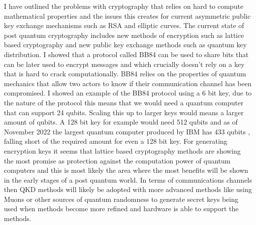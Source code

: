 \documentclass{article}
\begin{document}
I have outlined the problems with cryptography that relies on hard to compute mathematical properties and the issues this creates for current asymmetric public key exchange mechanisms such as RSA and elliptic curves. The current state of post quantum cryptography includes new methods of encryption such as lattice based cryptography and new public key exchange methods such as quantum key distribution. I showed that a protocol called BB84 can be used to share bits that can be later used to encrypt messages and which crucially doesn't rely on a key that is hard to crack computationally. BB84 relies on the properties of quantum mechanics that allow two actors to know if their communication channel has been compromised. I showed an example of the BB84 protocol using a 6 bit key, due to the nature of the protocol this means that we would need a quantum computer that can support 24 qubits. Scaling this up to larger keys would means a larger amount of qubits. A 128 bit key for example would need 512 qubits and as of November 2022 the largest quantum computer produced by IBM has 433 qubits \cite{2022IBMScientist}, falling short of the required amount for even a 128 bit key.
For generating encryption keys it seems that lattice based cryptography methods are showing the most promise as protection against the computation power of quantum computers and this is most likely the area where the most benefits will be shown in the early stages of a post quantum world. 
In terms of communications channels then QKD methods will likely be adopted with more advanced methods like using Muons or other sources of quantum randomness to generate secret keys being used when methods become more refined and hardware is able to support the methods.

\printbibliography
\end{document}
